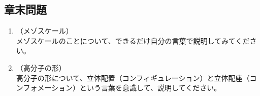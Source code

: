 \documentclass[a4paper,11pt]{jlreq}
\begin{document}
\subsection{章末問題}
	\begin{enumerate}
		\item
		（メゾスケール）\\
		メゾスケールのことについて、できるだけ自分の言葉で説明してみてください。
		\item
		（高分子の形）\\
		高分子の形について、立体配置（コンフィギュレーション）と立体配座（コンフォメーション）という言葉を意識して、説明してください。

	\end{enumerate}
\end{document}
